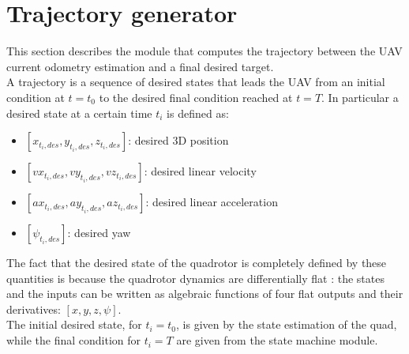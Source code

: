 \chapter{Trajectory generator}\label{chap:trajectory_generator}
This section describes the module that computes the trajectory between the UAV current odometry estimation and a final desired target. \\

A trajectory is a sequence of desired states that leads the UAV from an initial condition at $t = t_0 $ to the desired final condition reached at $t = T$. In particular a desired state at a certain time $t_i$ is defined as:
 \begin{itemize}
\item $[x_{t_i,des},y_{t_i,des},z_{t_i,des}]$: desired 3D position
\item $[vx_{t_i,des},vy_{t_i,des},vz_{t_i,des}]$: desired linear velocity
\item $[ax_{t_i,des},ay_{t_i,des},az_{t_i,des}]$: desired linear acceleration
\item $[\psi_{t_i,des}]$: desired yaw
\end{itemize}
The fact that the desired state of the quadrotor is completely defined by these quantities is because the quadrotor dynamics are differentially flat \cite{van1997real}: the states and the inputs can be written as algebraic functions of four flat outputs and their derivatives: $[x,y,z,\psi]$.\\

The initial desired state, for $t_i = t_0$, is given by the state estimation of the quad, while the final condition for $t_i = T$ are given from the state machine module. \\

